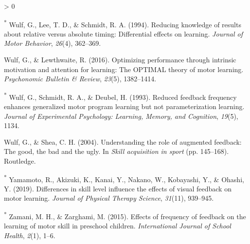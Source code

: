 \documentclass[
  english,
  man,mask,floatsintext]{apa7}
\newlength{\cslhangindent}
\newenvironment{CSLReferences}[2] %
 {%
  \setlength{\parindent}{0pt}
  \ifodd #1 \everypar{\setlength{\hangindent}{\cslhangindent}}\ignorespaces\fi
  \ifnum #2 > 0
  \setlength{\parskip}{#2\baselineskip}
  \fi
 }%
 {}
\begin{document}
\begin{CSLReferences}{1}{0}
\leavevmode\hypertarget{ref-Wulf1994}{}%
\textsuperscript{*} Wulf, G., Lee, T. D., \& Schmidt, R. A. (1994). Reducing knowledge of results about relative versus absolute timing: Differential effects on learning. \emph{Journal of Motor Behavior}, \emph{26}(4), 362--369.

\leavevmode\hypertarget{ref-Wulf2016}{}%
Wulf, G., \& Lewthwaite, R. (2016). Optimizing performance through intrinsic motivation and attention for learning: The OPTIMAL theory of motor learning. \emph{Psychonomic Bulletin \& Review}, \emph{23}(5), 1382--1414.

\leavevmode\hypertarget{ref-Wulf1993}{}%
\textsuperscript{*} Wulf, G., Schmidt, R. A., \& Deubel, H. (1993). Reduced feedback frequency enhances generalized motor program learning but not parameterization learning. \emph{Journal of Experimental Psychology: Learning, Memory, and Cognition}, \emph{19}(5), 1134.

\leavevmode\hypertarget{ref-Wulf2004}{}%
Wulf, G., \& Shea, C. H. (2004). Understanding the role of augmented feedback: The good, the bad and the ugly. In \emph{Skill acquisition in sport} (pp. 145--168). Routledge.

\leavevmode\hypertarget{ref-Yamamoto2019}{}%
\textsuperscript{*} Yamamoto, R., Akizuki, K., Kanai, Y., Nakano, W., Kobayashi, Y., \& Ohashi, Y. (2019). Differences in skill level influence the effects of visual feedback on motor learning. \emph{Journal of Physical Therapy Science}, \emph{31}(11), 939--945.

\leavevmode\hypertarget{ref-Zamani2015}{}%
\textsuperscript{*} Zamani, M. H., \& Zarghami, M. (2015). Effects of frequency of feedback on the learning of motor skill in preschool children. \emph{International Journal of School Health}, \emph{2}(1), 1--6.

\end{CSLReferences}
\end{document}
